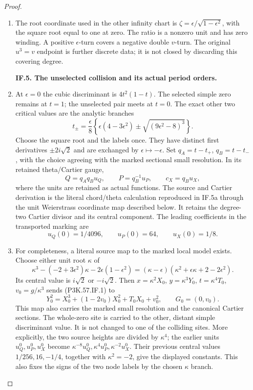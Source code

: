 \begin{proof}
\begin{enumerate}[label=\arabic*.]
\item The root coordinate used in the other infinity chart is
\(\zeta=\epsilon/\sqrt{1-\epsilon^2}\), with the square root equal to one
at zero. The ratio is a nonzero unit and has zero winding. A positive
\(\epsilon\)-turn covers a negative double \(v\)-turn. The original
\(u^3=v\) endpoint is further discrete data; it is not closed by
discarding this covering degree.

\par\medskip\noindent\textbf{IF.5. The unselected collision and its actual period orders.}\par\nopagebreak[4]

\item At \(\epsilon=0\) the cubic discriminant is \(4t^2(1-t)\). The selected
simple zero remains at \(t=1\); the unselected pair meets at \(t=0\).
The exact other two critical values are the analytic branches
\[
 t_\pm=\frac{\epsilon}{8}
 \left\{\epsilon(4-3\epsilon^2)
          \pm\sqrt{(9\epsilon^2-8)^3}\right\}.           \tag{P3K.57.IF.13}
\]
Choose the square root and the labels once. They have distinct first
derivatives \(\pm2i\sqrt2\) and are exchanged by \(\epsilon\mapsto-\epsilon\).
Set \(q_A=t-t_+\), \(q_B=t-t_-\), with the choice agreeing with the marked
sectional small resolution. In its retained theta/Cartier gauge,
\[
 Q=q_Aq_Bu_Q,\qquad P=q_B^{-1}u_P,\qquad
 c_X=q_Bu_X,                                           \tag{P3K.57.IF.14}
\]
where the units are retained as actual functions. The source and
Cartier derivation is the literal chord/theta calculation reproduced
in IF.5a through the unit Weierstrass coordinate map described below.
It retains the degree-two Cartier divisor and its central component.
The leading coefficients in the transported marking are
\[
               u_Q(0)=1/4096,\qquad u_P(0)=64,\qquad u_X(0)=1/8 .
\]

\item For completeness, a literal source map to the marked local model exists.
Choose either unit root \(\kappa\) of
\[
 \kappa^3-(-2+3\epsilon^2)\kappa-2\epsilon(1-\epsilon^2)
 =(\kappa-\epsilon)(\kappa^2+\epsilon\kappa+2-2\epsilon^2).
\]
Its central value is \(i\sqrt2\) or \(-i\sqrt2\).
Then \(x=\kappa^2 X_0\), \(y=\kappa^3Y_0\),
\(t=\kappa^4T_0\), \(v_0=g/\kappa^3\) sends (P3K.57.IF.1) to
\[
 Y_0^2=X_0^3+(1-2v_0)X_0^2+T_0X_0+v_0^2,\qquad G_0=(0,v_0).
\]
This map also carries the marked small resolution and the canonical
Cartier sections. The whole-zero site is carried to the other, distant
simple discriminant value. It is not changed to one of the colliding sites.
More explicitly, the two source heights are divided by \(\kappa^4\);
the earlier units \(u_Q^0,u_P^0,u_X^0\) become
\(\kappa^{-8}u_Q^0,\kappa^4u_P^0,\kappa^{-2}u_X^0\).
Their previous central values \(1/256,16,-1/4\), together with
\(\kappa^2=-2\), give the displayed constants. This also fixes the signs
of the two node labels by the chosen \(\kappa\) branch.


\end{enumerate}
\end{proof}
